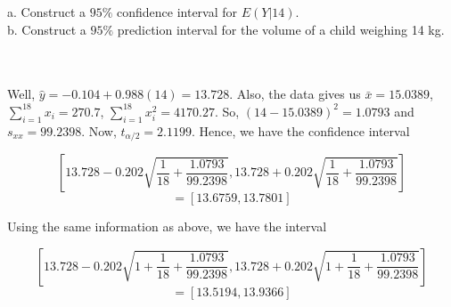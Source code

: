 a. Construct a $95\%$ confidence interval for $E(Y|14)$.\\

b. Construct a $95\%$ prediction interval for the volume of a child weighing 14 kg.\\\\

\begin{solution}\renewcommand{\qedsymbol}{}\ \\
    Well, $\hat{y}=-0.104+0.988(14)=13.728$. Also, the data gives us $\bar{x}=15.0389$,
    $\sum_{i=1}^{18}x_i=270.7$, $\sum_{i=1}^{18}x_i^2=4170.27$. So, $(14-15.0389)^2=1.0793$ and
    $s_{xx}=99.2398$. Now, $t_{\alpha/2}=2.1199$. Hence, we have the confidence interval
    
    $$[13.728-0.202\sqrt{\frac{1}{18}+\frac{1.0793}{99.2398}},
    13.728+0.202\sqrt{\frac{1}{18}+\frac{1.0793}{99.2398}}]$$
    $$=[13.6759, 13.7801]$$

    Using the same information as above, we have the interval
    
    $$[13.728-0.202\sqrt{1+\frac{1}{18}+\frac{1.0793}{99.2398}},
    13.728+0.202\sqrt{1+\frac{1}{18}+\frac{1.0793}{99.2398}}]$$
    $$=[13.5194, 13.9366]$$

\end{solution}